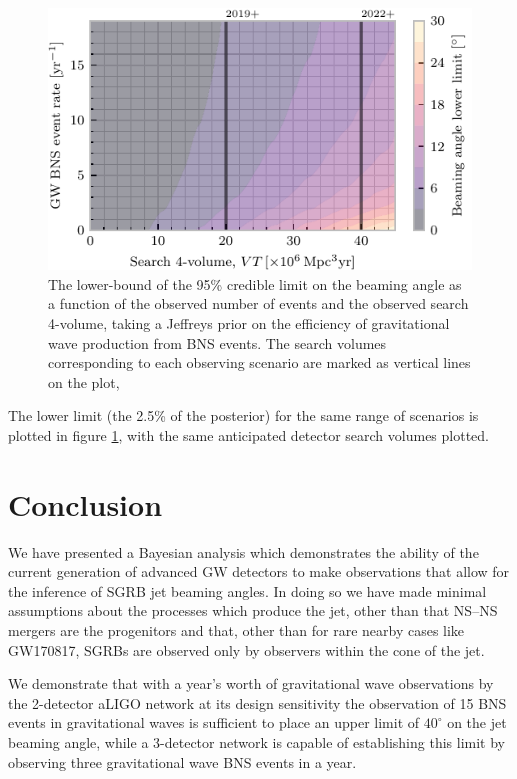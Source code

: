\documentclass[twocolumn]{aastex61}
\newcommand{\BNS}{\ac{NS}--\ac{NS}\xspace}
\begin{document}
\begin{figure}
\centering
\includegraphics[width=\linewidth]{volume_v_nevents_lower.pdf}
\caption{\label{fig:volumevevents_lower} The lower-bound of the 95\%
  credible limit on the beaming angle as a function of the observed
  number of events and the observed search 4-volume, taking a Jeffreys
  prior on the efficiency of gravitational wave production from BNS
  events. The search volumes corresponding to each observing scenario
  are marked as vertical lines on the plot, }
\end{figure}

The lower limit (the 2.5\% of the posterior) for the same range of
scenarios is plotted in figure \ref{fig:volumevevents_lower}, with the
same anticipated detector search volumes plotted.

\section{Conclusion}

We have presented a Bayesian analysis which demonstrates the ability
of the current generation of advanced \ac{GW} detectors to make observations
that allow for the inference of \ac{SGRB} jet beaming angles. In doing so we
have made minimal assumptions about the processes which produce the jet, other
than that \BNS mergers are the progenitors and that, other than for rare nearby
cases like GW170817, \acp{SGRB} are observed only by observers within the cone
of the jet.

We demonstrate that with a year's worth of gravitational wave
observations by the 2-detector \ac{aLIGO} network at its design
sensitivity the observation of 15 BNS events in gravitational waves is
sufficient to place an upper limit of $40^{\circ}$ on the jet beaming
angle, while a 3-detector network is capable of establishing this
limit by observing three gravitational wave BNS events in a year.
\end{document}
